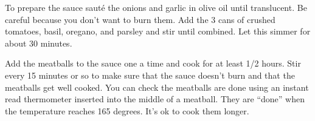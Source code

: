 \begin{IngredientsAndSteps}
    {}

    {
        To prepare the sauce sauté the onions and garlic in olive oil until translucent. Be careful because you don't want to burn
        them. Add the 3 cans of crushed tomatoes, basil, oregano, and parsley and stir until combined. Let this simmer for about 30
        minutes.
    }

    {
        Add the meatballs to the sauce one a time and cook for at least 1/2 hours. Stir every 15 minutes or so to make
        sure that the sauce doesn't burn and that the meatballs get well cooked. You can check the meatballs are done using
        an instant read thermometer inserted into the middle of a meatball. They are ``done'' when the temperature reaches
        165 degrees. It's ok to cook them longer.
    }
\end{IngredientsAndSteps}

%
%
%
%
\newpage



